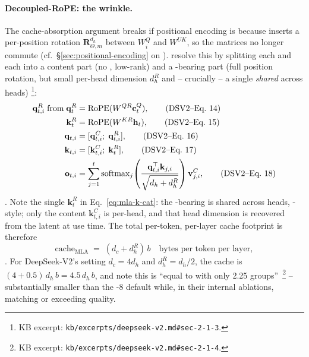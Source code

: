 \paragraph{Decoupled-RoPE: the wrinkle.}
The cache-absorption argument breaks if positional encoding is 
because  inserts a per-position rotation
$\boldsymbol{R}^{d_h}_{\Theta, m}$ between $W_i^Q$ and $W^{UK}$, so
the matrices no longer commute (cf.\ \S\ref{sec:positional-encoding}
on ). \citet{deepseek-v2} resolve this by splitting each 
and each  into a content part (no , low-rank) and a
-bearing part (full position rotation, but small per-head
dimension $d_h^R$ and -- crucially -- a single \emph{shared} 
 across heads)%
\footnote{KB excerpt: \texttt{kb/excerpts/deepseek-v2.md\#sec-2-1-3}.}:
\begin{align}
  \mathbf{q}_{t,i}^R\;\text{from}\;\mathbf{q}_t^R
   &= \mathrm{RoPE}(W^{QR} \mathbf{c}_t^Q),
   \tag{DSV2--Eq.~14} \label{eq:mla-qr} \\
  \mathbf{k}_t^R
   &= \mathrm{RoPE}(W^{KR} \mathbf{h}_t),
   \tag{DSV2--Eq.~15} \label{eq:mla-kr} \\
  \mathbf{q}_{t,i}
   &= [\mathbf{q}_{t,i}^C;\;\mathbf{q}_{t,i}^R],
   \tag{DSV2--Eq.~16} \label{eq:mla-q-cat} \\
  \mathbf{k}_{t,i}
   &= [\mathbf{k}_{t,i}^C;\;\mathbf{k}_t^R],
   \tag{DSV2--Eq.~17} \label{eq:mla-k-cat} \\
  \mathbf{o}_{t,i}
   &= \sum_{j=1}^{t} \operatorname{softmax}_j\!\left(
     \frac{\mathbf{q}_{t,i}^\top \mathbf{k}_{j,i}}
          {\sqrt{d_h + d_h^R}}\right)
     \mathbf{v}_{j,i}^C,
   \tag{DSV2--Eq.~18} \label{eq:mla-out}
\end{align}
\citep[\S 2.1.3, Eq.~14--18]{deepseek-v2}. Note the single
$\mathbf{k}_t^R$ in Eq.~\eqref{eq:mla-k-cat}: the -bearing  is
shared across heads, -style; only the content 
$\mathbf{k}_{t,i}^C$ is per-head, and that head dimension is
recovered from the latent at use time. The total per-token,
per-layer cache footprint is therefore
\begin{equation}
  \mathrm{cache}_{\mathrm{MLA}}
   \;=\; (d_c + d_h^R)\,b
   \quad\text{bytes per token per layer},
  \label{eq:mla-cache}
\end{equation}
\citep[\S 2.1.3]{deepseek-v2}. For DeepSeek-V2's setting
$d_c = 4 d_h$ and $d_h^R = d_h/2$, the cache is
$(4 + 0.5)\,d_h\,b = 4.5\,d_h\,b$, and \citet{deepseek-v2} note this
is ``equal to  with only 2.25 groups''~\citep[\S
2.1.4]{deepseek-v2}\footnote{KB excerpt:
\texttt{kb/excerpts/deepseek-v2.md\#sec-2-1-4}.} -- substantially
smaller than the -8 default while, in their internal ablations,
matching or exceeding  quality.

